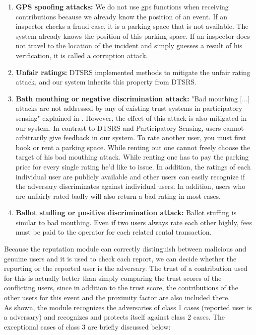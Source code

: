 \begin{enumerate}
\item \textbf{GPS spoofing attacks:} We do not use gps functions when receiving contributions because we already know the position of an event. If an inspector checks a fraud case, it is a parking space that is not available. The system already knows the position of this parking space. If an inspector does not travel to the location of the incident and simply guesses a result of his verification, it is called a corruption attack.
\item \textbf{Unfair ratings:} DTSRS implemented methods to mitigate the unfair rating attack, and our system inherits this property from DTSRS.
\item \textbf{Bath mouthing or negative discrimination attack:} "Bad mouthing [...] attacks are not addressed by any of existing trust systems in participatory sensing"  explained in \cite{mousa2015trust}. However, the effect of this attack is also mitigated in our system. In contrast to DTSRS and Participatory Sensing, users cannot arbitrarily give feedback in our system. To rate another user, you must first book or rent a parking space. While renting out one cannot freely choose the target of his bad mouthing attack. While renting one has to pay the parking price for every single rating he'd like to issue. In addition, the ratings of each individual user are publicly available and other users can easily recognize if the adversary discriminates against individual users. In addition, users who are unfairly rated badly will also return a bad rating in most cases.
\item \textbf{Ballot stuffing or positive discrimination attack:} Ballot stuffing is similar to bad mouthing. Even if two users always rate each other highly, fees must be paid to the operator for each related rental transaction.
\end{enumerate}

Because the reputation module can correctly distinguish between malicious and genuine users and it is used to check each report, we can decide whether the reporting or the reported user is the adversary. The trust of a contribution used for this is actually better than simply comparing the trust scores of the conflicting users, since in addition to the trust score, the contributions of the other users for this event and the proximity factor are also included there. \\

As shown, the module recognizes the adversaries of class 1 cases (reported user is a adversary) and recognizes and protects itself against class 2 cases. The exceptional cases of class 3 are briefly discussed below: 

